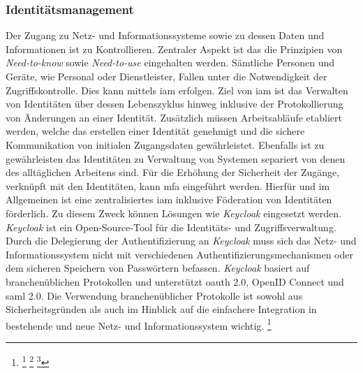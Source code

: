 \documentclass[11pt,a4paper,hidelinks]{article}   %
\begin{document}
            \subsubsection{Identitätsmanagement}
            Der Zugang zu Netz- und Informationssysteme sowie zu dessen Daten und Informationen ist zu Kontrollieren. Zentraler Aspekt ist das die Prinzipien von \emph{Need-to-know} sowie \emph{Need-to-use} eingehalten werden. Sämtliche Personen und Geräte, wie Personal oder Dienstleister, Fallen unter die Notwendigkeit der Zugriffskontrolle. Dies kann mittels \gls{iam} erfolgen. Ziel von \gls{iam} ist das Verwalten von Identitäten über dessen Lebenszyklus hinweg inklusive der Protokollierung von Änderungen an einer Identität. Zusätzlich müssen Arbeitsabläufe etabliert werden, welche das erstellen einer Identität genehmigt und die sichere Kommunikation von initialen Zugangsdaten gewährleistet. Ebenfalls ist zu gewährleisten das Identitäten zu Verwaltung von Systemen separiert von denen des alltäglichen Arbeitens sind. Für die Erhöhung der Sicherheit der Zugänge, verknüpft mit den Identitäten, kann \gls{mfa} eingeführt werden. Hierfür und im Allgemeinen ist eine zentralisiertes \gls{iam} inklusive Föderation von Identitäten förderlich. Zu diesem Zweck können Lösungen wie \emph{Keycloak} eingesetzt werden. \emph{Keycloak} ist ein Open-Source-Tool für die Identitäts- und Zugriffsverwaltung. Durch die Delegierung der Authentifizierung an \emph{Keycloak} muss sich das Netz- und Informationssystem nicht mit verschiedenen Authentifizierungsmechanismen oder dem sicheren Speichern von Passwörtern befassen. \emph{Keycloak} basiert auf branchenüblichen Protokollen und unterstützt \gls{oauth} 2.0, OpenID Connect und \gls{saml} 2.0. Die Verwendung branchenüblicher Protokolle ist sowohl aus Sicherheitsgründen als auch im Hinblick auf die einfachere Integration in bestehende und neue Netz- und Informationssystem wichtig.
            \footnote{
                \footcite[Vgl. S. 3 - 6, 13 - 15][]{9781836797661} %
                \footcite[Vgl. S. 150, 173 - 180][]{9789811926570}
                \footcite[Vgl. S. 4 - 5, 187, 197, 203 - 204][]{9781800562493}
            }
\end{document}
